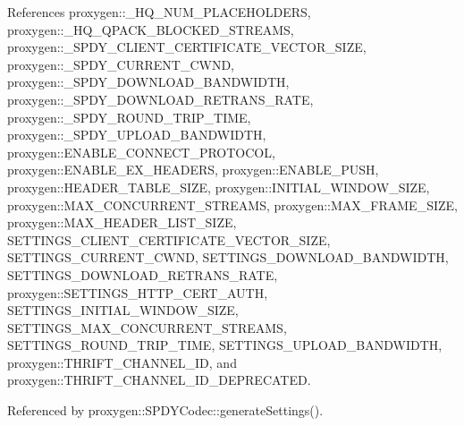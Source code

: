 References proxygen\+::\+\_\+\+H\+Q\+\_\+\+N\+U\+M\+\_\+\+P\+L\+A\+C\+E\+H\+O\+L\+D\+E\+RS, proxygen\+::\+\_\+\+H\+Q\+\_\+\+Q\+P\+A\+C\+K\+\_\+\+B\+L\+O\+C\+K\+E\+D\+\_\+\+S\+T\+R\+E\+A\+MS, proxygen\+::\+\_\+\+S\+P\+D\+Y\+\_\+\+C\+L\+I\+E\+N\+T\+\_\+\+C\+E\+R\+T\+I\+F\+I\+C\+A\+T\+E\+\_\+\+V\+E\+C\+T\+O\+R\+\_\+\+S\+I\+ZE, proxygen\+::\+\_\+\+S\+P\+D\+Y\+\_\+\+C\+U\+R\+R\+E\+N\+T\+\_\+\+C\+W\+ND, proxygen\+::\+\_\+\+S\+P\+D\+Y\+\_\+\+D\+O\+W\+N\+L\+O\+A\+D\+\_\+\+B\+A\+N\+D\+W\+I\+D\+TH, proxygen\+::\+\_\+\+S\+P\+D\+Y\+\_\+\+D\+O\+W\+N\+L\+O\+A\+D\+\_\+\+R\+E\+T\+R\+A\+N\+S\+\_\+\+R\+A\+TE, proxygen\+::\+\_\+\+S\+P\+D\+Y\+\_\+\+R\+O\+U\+N\+D\+\_\+\+T\+R\+I\+P\+\_\+\+T\+I\+ME, proxygen\+::\+\_\+\+S\+P\+D\+Y\+\_\+\+U\+P\+L\+O\+A\+D\+\_\+\+B\+A\+N\+D\+W\+I\+D\+TH, proxygen\+::\+E\+N\+A\+B\+L\+E\+\_\+\+C\+O\+N\+N\+E\+C\+T\+\_\+\+P\+R\+O\+T\+O\+C\+OL, proxygen\+::\+E\+N\+A\+B\+L\+E\+\_\+\+E\+X\+\_\+\+H\+E\+A\+D\+E\+RS, proxygen\+::\+E\+N\+A\+B\+L\+E\+\_\+\+P\+U\+SH, proxygen\+::\+H\+E\+A\+D\+E\+R\+\_\+\+T\+A\+B\+L\+E\+\_\+\+S\+I\+ZE, proxygen\+::\+I\+N\+I\+T\+I\+A\+L\+\_\+\+W\+I\+N\+D\+O\+W\+\_\+\+S\+I\+ZE, proxygen\+::\+M\+A\+X\+\_\+\+C\+O\+N\+C\+U\+R\+R\+E\+N\+T\+\_\+\+S\+T\+R\+E\+A\+MS, proxygen\+::\+M\+A\+X\+\_\+\+F\+R\+A\+M\+E\+\_\+\+S\+I\+ZE, proxygen\+::\+M\+A\+X\+\_\+\+H\+E\+A\+D\+E\+R\+\_\+\+L\+I\+S\+T\+\_\+\+S\+I\+ZE, S\+E\+T\+T\+I\+N\+G\+S\+\_\+\+C\+L\+I\+E\+N\+T\+\_\+\+C\+E\+R\+T\+I\+F\+I\+C\+A\+T\+E\+\_\+\+V\+E\+C\+T\+O\+R\+\_\+\+S\+I\+ZE, S\+E\+T\+T\+I\+N\+G\+S\+\_\+\+C\+U\+R\+R\+E\+N\+T\+\_\+\+C\+W\+ND, S\+E\+T\+T\+I\+N\+G\+S\+\_\+\+D\+O\+W\+N\+L\+O\+A\+D\+\_\+\+B\+A\+N\+D\+W\+I\+D\+TH, S\+E\+T\+T\+I\+N\+G\+S\+\_\+\+D\+O\+W\+N\+L\+O\+A\+D\+\_\+\+R\+E\+T\+R\+A\+N\+S\+\_\+\+R\+A\+TE, proxygen\+::\+S\+E\+T\+T\+I\+N\+G\+S\+\_\+\+H\+T\+T\+P\+\_\+\+C\+E\+R\+T\+\_\+\+A\+U\+TH, S\+E\+T\+T\+I\+N\+G\+S\+\_\+\+I\+N\+I\+T\+I\+A\+L\+\_\+\+W\+I\+N\+D\+O\+W\+\_\+\+S\+I\+ZE, S\+E\+T\+T\+I\+N\+G\+S\+\_\+\+M\+A\+X\+\_\+\+C\+O\+N\+C\+U\+R\+R\+E\+N\+T\+\_\+\+S\+T\+R\+E\+A\+MS, S\+E\+T\+T\+I\+N\+G\+S\+\_\+\+R\+O\+U\+N\+D\+\_\+\+T\+R\+I\+P\+\_\+\+T\+I\+ME, S\+E\+T\+T\+I\+N\+G\+S\+\_\+\+U\+P\+L\+O\+A\+D\+\_\+\+B\+A\+N\+D\+W\+I\+D\+TH, proxygen\+::\+T\+H\+R\+I\+F\+T\+\_\+\+C\+H\+A\+N\+N\+E\+L\+\_\+\+ID, and proxygen\+::\+T\+H\+R\+I\+F\+T\+\_\+\+C\+H\+A\+N\+N\+E\+L\+\_\+\+I\+D\+\_\+\+D\+E\+P\+R\+E\+C\+A\+T\+ED.



Referenced by proxygen\+::\+S\+P\+D\+Y\+Codec\+::generate\+Settings().


